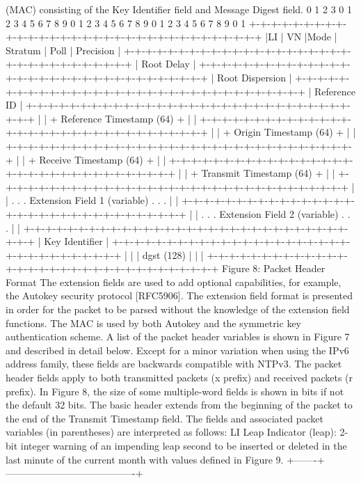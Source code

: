  (MAC) consisting of the Key Identifier field and Message Digest
 field.
0 1 2 3
 0 1 2 3 4 5 6 7 8 9 0 1 2 3 4 5 6 7 8 9 0 1 2 3 4 5 6 7 8 9 0 1
 +-+-+-+-+-+-+-+-+-+-+-+-+-+-+-+-+-+-+-+-+-+-+-+-+-+-+-+-+-+-+-+-+
 |LI | VN |Mode | Stratum | Poll | Precision |
 +-+-+-+-+-+-+-+-+-+-+-+-+-+-+-+-+-+-+-+-+-+-+-+-+-+-+-+-+-+-+-+-+
 | Root Delay |
 +-+-+-+-+-+-+-+-+-+-+-+-+-+-+-+-+-+-+-+-+-+-+-+-+-+-+-+-+-+-+-+-+
 | Root Dispersion |
 +-+-+-+-+-+-+-+-+-+-+-+-+-+-+-+-+-+-+-+-+-+-+-+-+-+-+-+-+-+-+-+-+
 | Reference ID |
 +-+-+-+-+-+-+-+-+-+-+-+-+-+-+-+-+-+-+-+-+-+-+-+-+-+-+-+-+-+-+-+-+
 | |
 + Reference Timestamp (64) +
 | |
 +-+-+-+-+-+-+-+-+-+-+-+-+-+-+-+-+-+-+-+-+-+-+-+-+-+-+-+-+-+-+-+-+
 | |
 + Origin Timestamp (64) +
 | |
 +-+-+-+-+-+-+-+-+-+-+-+-+-+-+-+-+-+-+-+-+-+-+-+-+-+-+-+-+-+-+-+-+
 | |
 + Receive Timestamp (64) +
 | |
 +-+-+-+-+-+-+-+-+-+-+-+-+-+-+-+-+-+-+-+-+-+-+-+-+-+-+-+-+-+-+-+-+
 | |
 + Transmit Timestamp (64) +
 | |
 +-+-+-+-+-+-+-+-+-+-+-+-+-+-+-+-+-+-+-+-+-+-+-+-+-+-+-+-+-+-+-+-+
 | |
 . .
 . Extension Field 1 (variable) .
 . .
 | |
 +-+-+-+-+-+-+-+-+-+-+-+-+-+-+-+-+-+-+-+-+-+-+-+-+-+-+-+-+-+-+-+-+
 | |
 . .
 . Extension Field 2 (variable) .
 . .
 | |
 +-+-+-+-+-+-+-+-+-+-+-+-+-+-+-+-+-+-+-+-+-+-+-+-+-+-+-+-+-+-+-+-+
 | Key Identifier |
 +-+-+-+-+-+-+-+-+-+-+-+-+-+-+-+-+-+-+-+-+-+-+-+-+-+-+-+-+-+-+-+-+
 | |
 | dgst (128) |
 | |
 +-+-+-+-+-+-+-+-+-+-+-+-+-+-+-+-+-+-+-+-+-+-+-+-+-+-+-+-+-+-+-+-+
 Figure 8: Packet Header Format
The extension fields are used to add optional capabilities, for
 example, the Autokey security protocol [RFC5906]. The extension
 field format is presented in order for the packet to be parsed
 without the knowledge of the extension field functions. The MAC is
 used by both Autokey and the symmetric key authentication scheme.
 A list of the packet header variables is shown in Figure 7 and
 described in detail below. Except for a minor variation when using
 the IPv6 address family, these fields are backwards compatible with
 NTPv3. The packet header fields apply to both transmitted packets (x
 prefix) and received packets (r prefix). In Figure 8, the size of
 some multiple-word fields is shown in bits if not the default 32
 bits. The basic header extends from the beginning of the packet to
 the end of the Transmit Timestamp field.
 The fields and associated packet variables (in parentheses) are
 interpreted as follows:
 LI Leap Indicator (leap): 2-bit integer warning of an impending leap
 second to be inserted or deleted in the last minute of the current
 month with values defined in Figure 9.
 +-------+----------------------------------------+
